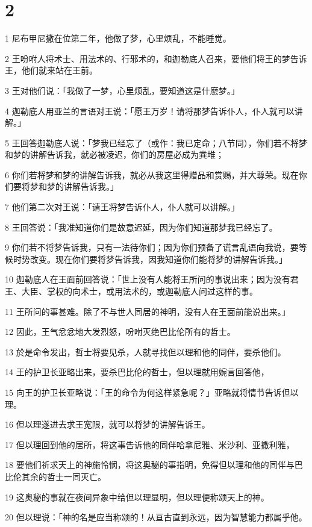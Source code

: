 \chapter{2}

\par 1 尼布甲尼撒在位第二年，他做了梦，心里烦乱，不能睡觉。
\par 2 王吩咐人将术士、用法术的、行邪术的，和迦勒底人召来，要他们将王的梦告诉王，他们就来站在王前。
\par 3 王对他们说：「我做了一梦，心里烦乱，要知道这是什麽梦。」
\par 4 迦勒底人用亚兰的言语对王说：「愿王万岁！请将那梦告诉仆人，仆人就可以讲解。」
\par 5 王回答迦勒底人说：「梦我已经忘了（或作：我已定命；八节同），你们若不将梦和梦的讲解告诉我，就必被凌迟，你们的房屋必成为粪堆；
\par 6 你们若将梦和梦的讲解告诉我，就必从我这里得赠品和赏赐，并大尊荣。现在你们要将梦和梦的讲解告诉我。」
\par 7 他们第二次对王说：「请王将梦告诉仆人，仆人就可以讲解。」
\par 8 王回答说：「我准知道你们是故意迟延，因为你们知道那梦我已经忘了。
\par 9 你们若不将梦告诉我，只有一法待你们；因为你们预备了谎言乱语向我说，要等候时势改变。现在你们要将梦告诉我，因我知道你们能将梦的讲解告诉我。」
\par 10 迦勒底人在王面前回答说：「世上没有人能将王所问的事说出来；因为没有君王、大臣、掌权的向术士，或用法术的，或迦勒底人问过这样的事。
\par 11 王所问的事甚难。除了不与世人同居的神明，没有人在王面前能说出来。」
\par 12 因此，王气忿忿地大发烈怒，吩咐灭绝巴比伦所有的哲士。
\par 13 於是命令发出，哲士将要见杀，人就寻找但以理和他的同伴，要杀他们。
\par 14 王的护卫长亚略出来，要杀巴比伦的哲士，但以理就用婉言回答他，
\par 15 向王的护卫长亚略说：「王的命令为何这样紧急呢？」亚略就将情节告诉但以理。
\par 16 但以理遂进去求王宽限，就可以将梦的讲解告诉王。
\par 17 但以理回到他的居所，将这事告诉他的同伴哈拿尼雅、米沙利、亚撒利雅，
\par 18 要他们祈求天上的神施怜悯，将这奥秘的事指明，免得但以理和他的同伴与巴比伦其余的哲士一同灭亡。
\par 19 这奥秘的事就在夜间异象中给但以理显明，但以理便称颂天上的神。
\par 20 但以理说：「神的名是应当称颂的！从亘古直到永远，因为智慧能力都属乎他。
